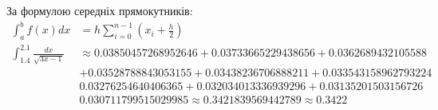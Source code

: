 За формулою середніх прямокутників:
\begin{align}
    \int_{a}^{b} f(x) dx
     & = h \sum_{i = 0}^{n - 1} (x_i + \frac{h}{2}) \\
    \int_{1.4}^{2.1} \frac{dx}{\sqrt{3x - 1}}
     & \approx
    0.03850457268952646
    + 0.03733665229438656
    + 0.0362689432105588                            \\
     & + 0.03528788843053155
    + 0.03438236706888211
    + 0.033543158962793224                          \\
     & 0.03276254640406365
    + 0.032034013336939296
    + 0.03135201503156726                           \\
     & 0.030711799515029985
    \approx 0.3421839569442789
    \approx 0.3422
\end{align}
